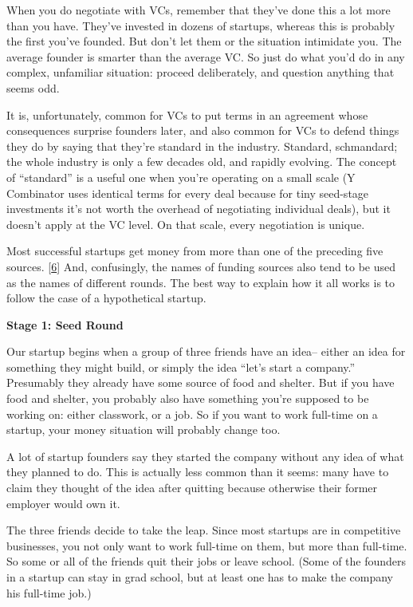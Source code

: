 When you do negotiate with VCs, remember that they've done this a lot
more than you have. They've invested in dozens of startups, whereas this
is probably the first you've founded. But don't let them or the
situation intimidate you. The average founder is smarter than the
average VC. So just do what you'd do in any complex, unfamiliar
situation: proceed deliberately, and question anything that seems odd.

It is, unfortunately, common for VCs to put terms in an agreement whose
consequences surprise founders later, and also common for VCs to defend
things they do by saying that they're standard in the industry.
Standard, schmandard; the whole industry is only a few decades old, and
rapidly evolving. The concept of ``standard'' is a useful one when
you're operating on a small scale (Y Combinator uses identical terms for
every deal because for tiny seed-stage investments it's not worth the
overhead of negotiating individual deals), but it doesn't apply at the
VC level. On that scale, every negotiation is unique.

Most successful startups get money from more than one of the preceding
five sources. {[}\hyperref[f6n]{6}{]} And, confusingly, the names of
funding sources also tend to be used as the names of different rounds.
The best way to explain how it all works is to follow the case of a
hypothetical startup.

\textbf{Stage 1: Seed Round}

Our startup begins when a group of three friends have an idea-- either
an idea for something they might build, or simply the idea ``let's start
a company.'' Presumably they already have some source of food and
shelter. But if you have food and shelter, you probably also have
something you're supposed to be working on: either classwork, or a job.
So if you want to work full-time on a startup, your money situation will
probably change too.

A lot of startup founders say they started the company without any idea
of what they planned to do. This is actually less common than it seems:
many have to claim they thought of the idea after quitting because
otherwise their former employer would own it.

The three friends decide to take the leap. Since most startups are in
competitive businesses, you not only want to work full-time on them, but
more than full-time. So some or all of the friends quit their jobs or
leave school. (Some of the founders in a startup can stay in grad
school, but at least one has to make the company his full-time job.)

